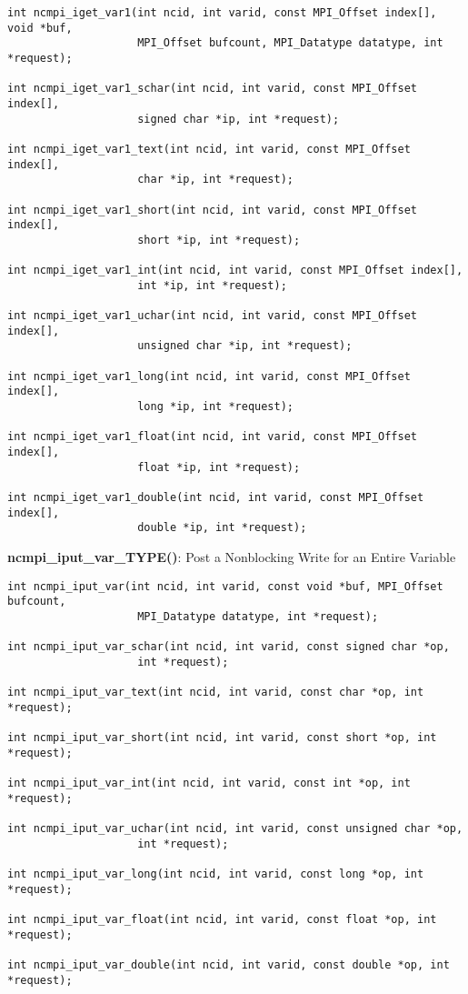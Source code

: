 \begin{verbatim}
int ncmpi_iget_var1(int ncid, int varid, const MPI_Offset index[], void *buf,
                    MPI_Offset bufcount, MPI_Datatype datatype, int *request);

int ncmpi_iget_var1_schar(int ncid, int varid, const MPI_Offset index[],
                    signed char *ip, int *request);

int ncmpi_iget_var1_text(int ncid, int varid, const MPI_Offset index[],
                    char *ip, int *request);

int ncmpi_iget_var1_short(int ncid, int varid, const MPI_Offset index[],
                    short *ip, int *request);

int ncmpi_iget_var1_int(int ncid, int varid, const MPI_Offset index[],
                    int *ip, int *request);

int ncmpi_iget_var1_uchar(int ncid, int varid, const MPI_Offset index[],
                    unsigned char *ip, int *request);

int ncmpi_iget_var1_long(int ncid, int varid, const MPI_Offset index[],
                    long *ip, int *request);

int ncmpi_iget_var1_float(int ncid, int varid, const MPI_Offset index[],
                    float *ip, int *request);

int ncmpi_iget_var1_double(int ncid, int varid, const MPI_Offset index[],
                    double *ip, int *request);
\end{verbatim}


{\bf ncmpi\_iput\_var\_TYPE()}: Post a Nonblocking Write for an Entire Variable

\begin{verbatim}
int ncmpi_iput_var(int ncid, int varid, const void *buf, MPI_Offset bufcount,
                    MPI_Datatype datatype, int *request);

int ncmpi_iput_var_schar(int ncid, int varid, const signed char *op,
                    int *request);

int ncmpi_iput_var_text(int ncid, int varid, const char *op, int *request);

int ncmpi_iput_var_short(int ncid, int varid, const short *op, int *request);

int ncmpi_iput_var_int(int ncid, int varid, const int *op, int *request);

int ncmpi_iput_var_uchar(int ncid, int varid, const unsigned char *op,
                    int *request);

int ncmpi_iput_var_long(int ncid, int varid, const long *op, int *request);

int ncmpi_iput_var_float(int ncid, int varid, const float *op, int *request);

int ncmpi_iput_var_double(int ncid, int varid, const double *op, int *request);
\end{verbatim}


